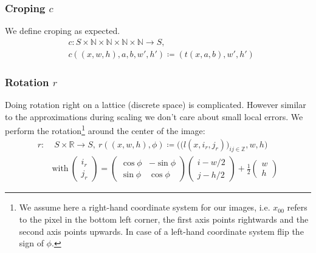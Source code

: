 \documentclass{article}
\begin{document}
\subsubsection{Croping $c$}
We define croping as expected.
\begin{align}
&c : S\times\mathbb N\times\mathbb N\times\mathbb N\times\mathbb N \to S,\nonumber\\
&c((x,w,h), a, b, w', h') \coloneqq (t(x, a, b), w', h')
\end{align}

\subsubsection{Rotation $r$}
Doing rotation right on a lattice (discrete space) is complicated. However similar to the approximations during scaling we don't care about small local errors. We perform the rotation\footnote{We assume here a right-hand coordinate system for our images, i.e. $x_{00}$ refers to the pixel in the bottom left corner, the first axis points rightwards and the second axis points upwards. In case of a left-hand coordinate system flip the sign of $\phi$.} around the center of the image:
\begin{align}
r :&\; S \times \mathbb R\to S,\ r((x, w, h), \phi) \coloneqq \big(\big(l(x, i_r, j_r )\big)_{ij\in \mathbb Z}, w, h\big)\\
&\text{with}\ \begin{pmatrix} i_r \\ j_r \end{pmatrix} = \begin{pmatrix}\cos\phi & -\sin\phi \\ \sin\phi & \cos\phi \end{pmatrix} \begin{pmatrix}i-w/2 \\ j-h/2 \end{pmatrix} + \frac 12\begin{pmatrix} w \\ h \end{pmatrix}\nonumber
\end{align}
\end{document}
